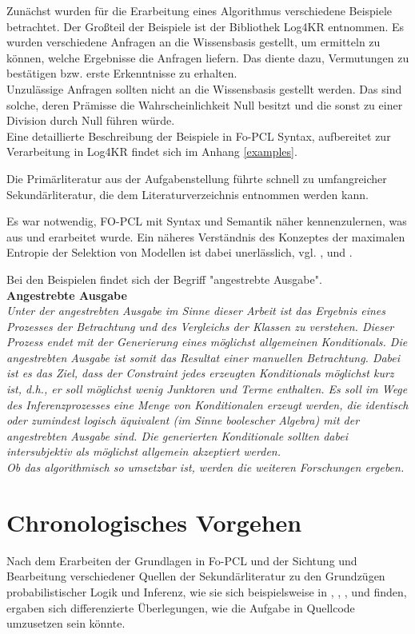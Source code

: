 \documentclass[a4paper, 11pt]{book}
\begin{document}
Zunächst wurden für die Erarbeitung eines Algorithmus verschiedene Beispiele betrachtet. Der Großteil der Beispiele ist der Bibliothek Log4KR entnommen. Es wurden verschiedene Anfragen an die Wissensbasis gestellt, um ermitteln zu können, welche Ergebnisse die Anfragen liefern. Das diente dazu, Vermutungen zu bestätigen bzw. erste Erkenntnisse zu erhalten.\\
Unzulässige Anfragen sollten nicht an die Wissensbasis gestellt werden. Das sind solche, deren Prämisse die Wahrscheinlichkeit Null besitzt und die sonst zu einer Division durch Null führen würde.\\
Eine detaillierte Beschreibung der Beispiele in Fo-PCL Syntax, aufbereitet zur Verarbeitung in Log4KR findet sich im Anhang \ref{examples}.


Die Primärliteratur aus der Aufgabenstellung \cite{Fis10} führte schnell zu umfangreicher Sekundärliteratur, die dem Literaturverzeichnis entnommen werden kann.

Es war notwendig, FO-PCL mit Syntax und Semantik näher kennenzulernen, was aus \cite{Fis10} und \cite{Fis12} erarbeitet wurde. Ein näheres Verständnis des Konzeptes der maximalen Entropie der Selektion von Modellen ist dabei unerlässlich, vgl. \cite{RKI97}, \cite{BKI08} und \cite{TFLKIB10}.



Bei den Beispielen findet sich der Begriff "{}angestrebte Ausgabe"{}.\\
\textbf{Angestrebte Ausgabe}\\
\label{angestrebte Ausgabe}
\emph{Unter der angestrebten Ausgabe im Sinne dieser Arbeit ist das Ergebnis eines Prozesses der Betrachtung und des Vergleichs der Klassen zu verstehen. Dieser Prozess endet mit der Generierung eines möglichst allgemeinen Konditionals. Die angestrebten Ausgabe ist somit das Resultat einer manuellen Betrachtung. Dabei ist es das Ziel, dass der Constraint jedes erzeugten Konditionals möglichst kurz ist, d.h., er soll möglichst wenig Junktoren und Terme enthalten. Es soll im Wege des Inferenzprozesses eine Menge von Konditionalen erzeugt werden, die identisch oder zumindest logisch äquivalent (im Sinne boolescher Algebra) mit der angestrebten Ausgabe sind.  Die generierten Konditionale sollten dabei intersubjektiv als möglichst allgemein akzeptiert werden.\\
Ob das algorithmisch so umsetzbar ist, werden die weiteren Forschungen ergeben.}


\section{Chronologisches Vorgehen}
Nach dem Erarbeiten der Grundlagen in Fo-PCL und der Sichtung und Bearbeitung verschiedener Quellen der Sekundärliteratur zu den Grundzügen probabilistischer Logik und Inferenz, wie sie sich beispielsweise in \cite{Fis09}, \cite{Fis10},  \cite{FLT09}, \cite{KIBFT11} und \cite{RKI97} finden, ergaben sich differenzierte Überlegungen, wie die Aufgabe in Quellcode umzusetzen sein könnte.
\end{document}
